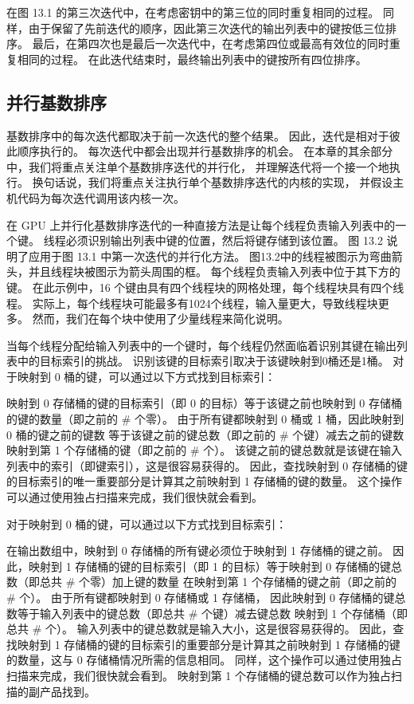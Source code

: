在图 13.1 的第三次迭代中，在考虑密钥中的第三位的同时重复相同的过程。 
同样，由于保留了先前迭代的顺序，因此第三次迭代的输出列表中的键按低三位排序。 
最后，在第四次也是最后一次迭代中，在考虑第四位或最高有效位的同时重复相同的过程。 
在此迭代结束时，最终输出列表中的键按所有四位排序。

\subsection{并行基数排序}
基数排序中的每次迭代都取决于前一次迭代的整个结果。 因此，迭代是相对于彼此顺序执行的。 
每次迭代中都会出现并行基数排序的机会。 在本章的其余部分中，我们将重点关注单个基数排序迭代的并行化，
并理解迭代将一个接一个地执行。 换句话说，我们将重点关注执行单个基数排序迭代的内核的实现，
并假设主机代码为每次迭代调用该内核一次。

在 GPU 上并行化基数排序迭代的一种直接方法是让每个线程负责输入列表中的一个键。 
线程必须识别输出列表中键的位置，然后将键存储到该位置。 图 13.2 说明了应用于图 13.1 中第一次迭代的并行化方法。 
图13.2中的线程被图示为弯曲箭头，并且线程块被图示为箭头周围的框。 每个线程负责输入列表中位于其下方的键。 
在此示例中，16 个键由具有四个线程块的网格处理，每个线程块具有四个线程。 
实际上，每个线程块可能最多有1024个线程，输入量更大，导致线程块更多。 然而，我们在每个块中使用了少量线程来简化说明。

当每个线程分配给输入列表中的一个键时，每个线程仍然面临着识别其键在输出列表中的目标索引的挑战。 
识别该键的目标索引取决于该键映射到0桶还是1桶。 对于映射到 0 桶的键，可以通过以下方式找到目标索引：

映射到 0 存储桶的键的目标索引（即 0 的目标）等于该键之前也映射到 0 存储桶的键的数量（即之前的 \# 个零）。 
由于所有键都映射到 0 桶或 1 桶，因此映射到 0 桶的键之前的键数
等于该键之前的键总数（即之前的 \# 个键）减去之前的键数 映射到第 1 个存储桶的键（即之前的 \# 个）。 
该键之前的键总数就是该键在输入列表中的索引（即键索引），这是很容易获得的。 
因此，查找映射到 0 存储桶的键的目标索引的唯一重要部分是计算其之前映射到 1 存储桶的键的数量。 
这个操作可以通过使用独占扫描来完成，我们很快就会看到。

对于映射到 0 桶的键，可以通过以下方式找到目标索引：

在输出数组中，映射到 0 存储桶的所有键必须位于映射到 1 存储桶的键之前。 
因此，映射到 1 存储桶的键的目标索引（即 1 的目标）等于映射到 0 存储桶的键总数（即总共 \# 个零）加上键的数量 在映射到第 1 个存储桶的键之前（即之前的 \# 个）。 
由于所有键都映射到 0 存储桶或 1 存储桶，
因此映射到 0 存储桶的键总数等于输入列表中的键总数（即总共 \# 个键）减去键总数 映射到 1 个存储桶（即总共 \# 个）。 
输入列表中的键总数就是输入大小，这是很容易获得的。 
因此，查找映射到 1 存储桶的键的目标索引的重要部分是计算其之前映射到 1 存储桶的键的数量，这与 0 存储桶情况所需的信息相同。 
同样，这个操作可以通过使用独占扫描来完成，我们很快就会看到。 映射到第 1 个存储桶的键总数可以作为独占扫描的副产品找到。

